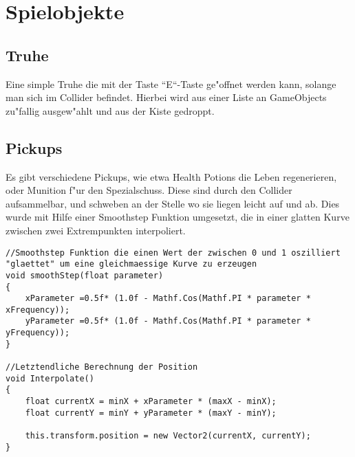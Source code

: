 \chapter{Spielobjekte}
\section{Truhe}
	Eine simple Truhe die mit der Taste ``E``-Taste ge"offnet werden kann, solange man sich im Collider befindet. Hierbei wird aus einer Liste an GameObjects zu"fallig ausgew"ahlt und aus der Kiste gedroppt.
\section{Pickups}
Es gibt verschiedene Pickups, wie etwa Health Potions die Leben regenerieren, oder Munition f"ur den Spezialschuss. Diese sind durch den Collider aufsammelbar, und schweben an der Stelle wo sie liegen leicht auf und ab. Dies wurde mit Hilfe einer Smoothstep Funktion umgesetzt, die in einer glatten Kurve zwischen zwei Extrempunkten interpoliert.

\begin{lstlisting}[breaklines=true]
//Smoothstep Funktion die einen Wert der zwischen 0 und 1 oszilliert "glaettet" um eine gleichmaessige Kurve zu erzeugen
void smoothStep(float parameter)
{
    xParameter =0.5f* (1.0f - Mathf.Cos(Mathf.PI * parameter * xFrequency));
    yParameter =0.5f* (1.0f - Mathf.Cos(Mathf.PI * parameter * yFrequency));
}

//Letztendliche Berechnung der Position
void Interpolate()
{
	float currentX = minX + xParameter * (maxX - minX);
	float currentY = minY + yParameter * (maxY - minY);

	this.transform.position = new Vector2(currentX, currentY);
}
\end{lstlisting}

